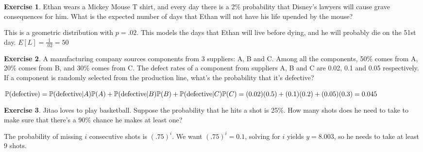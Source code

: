 \documentclass[12pt]{amsart}
\theoremstyle{definition}
\newtheorem{exercise}{Exercise}
\numberwithin{equation}{section}
\theoremstyle{plain}
\renewcommand{\P}{\mathbb{P}}
\begin{document}
 


\begin{exercise}
    Ethan wears a Mickey Mouse T shirt, and every day there is a 2\% probability that Disney's lawyers will cause grave consequences for him. What is the expected number of days that Ethan will not have his life upended by the mouse?
    \begin{answer}
    This is a geometric distribution with $p = .02$. This models the days that Ethan will live before dying, and he will probably die on the 51st day.
    $E[L] = \frac{1}{.02} = 50$
    
    \end{answer}
\end{exercise}

 

\begin{exercise}
    A manufacturing company sources components from 3 suppliers: A, B and C. Among all the components, 50\% comes from A, 20\% comes from B, and 30\% comes from C. The defect rates of a component from suppliers A, B and C are 0.02, 0.1 and 0.05 respectively. If a component is randomly selected from the production line, what’s the probability that it’s defective? %
    \begin{answer}
        $
            \P(\text{defective}) = \P(\text{defective}|A)\P(A) + \P(\text{defective}|B)\P(B) + \P(\text{defective}|C)\P(C) = 
            \\
            (0.02)(0.5) + (0.1)(0.2) + (0.05)(0.3) = 0.045
        $
    \end{answer}
\end{exercise}

 
    
\begin{exercise}
    Jitao loves to play basketball. Suppose the probability that he hits a shot is 25\%. How many shots does he need to take to make sure that there’s a 90\% chance he makes at least one? %
    \begin{answer}
        The probability of missing $i$ consecutive shots is $(.75)^i$. We want $(.75)^i = 0.1$, solving for $i$ yields $y = 8.003$, so he needs to take at least $9$ shots.
    \end{answer}
\end{exercise}
\end{document}
